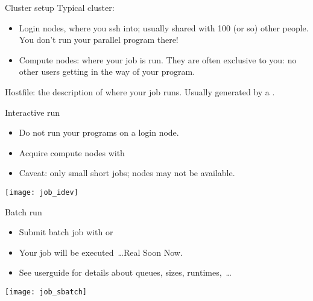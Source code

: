 
\begin{numberedframe}{Cluster setup}
  \small
  Typical cluster:
  \begin{itemize}
  \item Login nodes, where you ssh into; usually shared with 100 (or
    so) other people. You don't run your parallel program there!
  \item Compute nodes: where your job is run. They are often exclusive
    to you: no other users getting in the way of your program.
  \end{itemize}
  Hostfile: the description of where your job runs. Usually generated
  by a .
\end{numberedframe}

\begin{numberedframe}{Interactive run}
  \begin{itemize}
  \item Do not run your programs on a login node.
  \item Acquire compute nodes with 
  \item Caveat: only small short jobs; nodes may not be available.
  \end{itemize}
  \texttt{[image: job\_idev]}
\end{numberedframe}

\begin{numberedframe}{Batch run}
  \begin{itemize}
  \item Submit batch job with  or 
  \item Your job will be executed~\ldots Real Soon Now.
  \item See userguide for details about queues, sizes, runtimes,~\ldots
  \end{itemize}
  \texttt{[image: job\_sbatch]}
\end{numberedframe}

